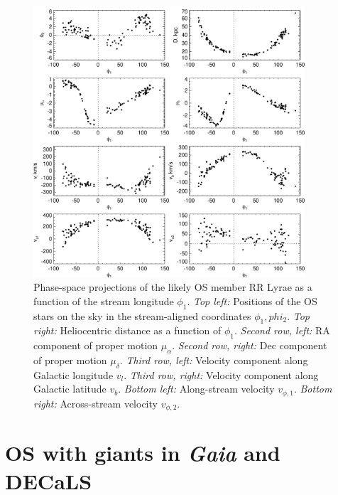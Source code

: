 \documentclass[a4paper,useAMS,usenatbib]{mnras}
\newcommand{\gaia}{\textit{Gaia} }
\begin{document}
%
\begin{figure}
  \centering
  \includegraphics[width=0.9\textwidth]{orphan_paper_phi1_members.pdf}
  \caption[]{Phase-space projections of the likely OS member RR Lyrae
    as a function of the stream longitude $\phi_1$. {\it Top left:}
    Positions of the OS stars on the sky in the stream-aligned
    coordinates $\phi_1, phi_2$. {\it Top right:} Heliocentric
    distance as a function of $\phi_1$. {\it Second row, left:} RA
    component of proper motion $\mu_{\alpha}$. {\it Second row,
      right:} Dec component of proper motion $\mu_{\delta}$. {\it
      Third row, left:} Velocity component along Galactic longitude
    $v_l$. {\it Third row, right:} Velocity component along Galactic
    latitude $v_b$. {\it Bottom left:} Along-stream velocity
    $v_{\phi,1}$. {\it Bottom right:} Across-stream velocity
    $v_{\phi,2}$.}
   \label{fig:memother}
\end{figure}
%

\section{OS with giants in \gaia and DECaLS}
\end{document}
